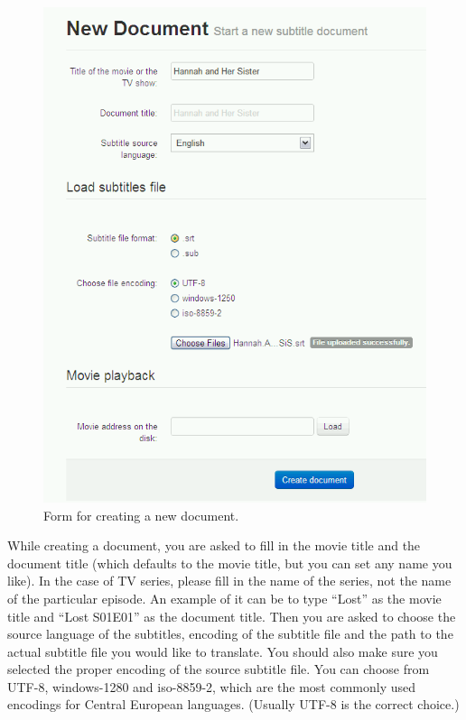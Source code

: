 \begin{figure}[h]
\begin{center}
\includegraphics[scale=0.4]{figures/user_manual/new_document.png}
\end{center}
\caption{Form for creating a new document.}
\end{figure}

While creating a document, you are asked to fill in the movie title and the document title (which defaults to the movie title, but you can set any name you like). In the case of TV series, please fill in the name of the series, not the name of the particular episode. An example of it can be to type ``Lost'' as the movie title and ``Lost S01E01'' as the document title. Then you are asked to choose the source language of the subtitles, encoding of the subtitle file and the path to the actual subtitle file you would like to translate. You should also make sure you selected the proper encoding of the source subtitle file. You can choose from UTF-8, windows-1280 and iso-8859-2, which are the most commonly used encodings for Central European languages. (Usually UTF-8 is the correct choice.)

